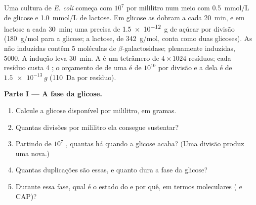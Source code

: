 \begin{problem}
\label{pb:b1:expression-control:1}
Uma cultura de \emph{E. coli} começa com $10^7$  por mililitro
num meio com \qty{0.5}{mmol/L} de glicose e \qty{1.0}{mmol/L} de
lactose. Em glicose as  dobram a cada \qty{20}{min}, e em lactose
a cada \qty{30}{min}; uma  precisa de \qty{1.5e-12}{g} de açúcar
por divisão (\qty{180}{g/mol} para a glicose; a lactose, de
\qty{342}{g/mol}, conta como duas glicoses). As  não induzidas
contêm 5 moléculas de $\beta$-galactosidase; plenamente induzidas,
\num{5000}. A indução leva \qty{30}{min}. A  é um tetrâmero de
$4\times 1024$ resíduos; cada resíduo custa 4 ; o orçamento de  de
uma  é de $10^{10}$ por divisão e a  dela é de
$\qty{1.5e-13}{g}$ (\qty{110}{Da} por resíduo).

\medskip
\noindent\textbf{Parte I --- A fase da glicose.}
\begin{enumerate}
  \item Calcule a glicose disponível por mililitro, em gramas.
  \item Quantas divisões por mililitro ela consegue sustentar?
  \item Partindo de $10^7$ , quantas  há quando a glicose
        acaba? (Uma divisão produz uma  nova.)
  \item Quantas duplicações são essas, e quanto dura a fase da glicose?
  \item Durante essa fase, qual é o estado do  e por quê, em
        termos moleculares ( e CAP)?
\end{enumerate}


\end{problem}

